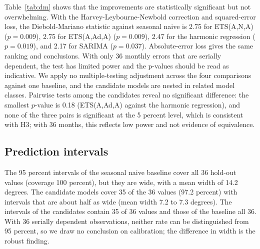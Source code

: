 \documentclass[11pt]{article}
\begin{document}
Table~\ref{tab:dm} shows that the improvements are statistically significant but not overwhelming. With the Harvey-Leybourne-Newbold correction and squared-error loss, the Diebold-Mariano statistic against seasonal naive is 2.75 for ETS(A,N,A) ($p=0.009$), 2.75 for ETS(A,Ad,A) ($p=0.009$), 2.47 for the harmonic regression ($p=0.019$), and 2.17 for SARIMA ($p=0.037$).
Absolute-error loss gives the same ranking and conclusions. With only 36 monthly errors that are serially dependent, the test has limited power and the p-values should be read as indicative. We apply no multiple-testing adjustment across the four comparisons against one baseline, and the candidate models are nested in related model classes. Pairwise tests among the candidates reveal no significant difference: the smallest $p$-value is 0.18 (ETS(A,Ad,A) against the harmonic regression), and none of the three pairs is significant at the 5 percent level, which is consistent with H3; with 36 months, this reflects low power and not evidence of equivalence.



\subsection{Prediction intervals}

The 95 percent intervals of the seasonal naive baseline cover all 36 hold-out values (coverage 100 percent), but they are wide, with a mean width of 14.2 degrees.
The candidate models cover 35 of the 36 values (97.2 percent) with intervals that are about half as wide (mean width 7.2 to 7.3 degrees).
The intervals of the candidates contain 35 of 36 values and those of the baseline all 36. With 36 serially dependent observations, neither rate can be distinguished from 95 percent, so we draw no conclusion on calibration; the difference in width is the robust finding.
\end{document}
